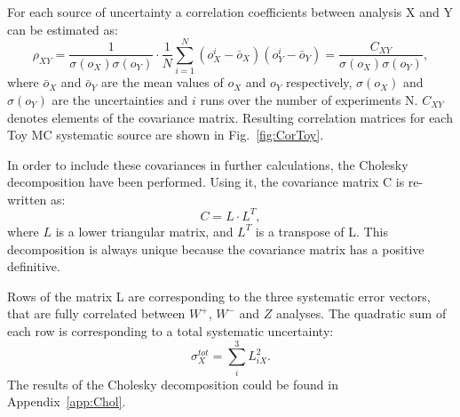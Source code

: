 For each source of uncertainty a correlation coefficients between analysis X and Y can be estimated as:
\begin{equation}\label{eq:Corr}
\rho_{XY}=\frac{1}{\sigma(o_X)\sigma(o_Y)}\cdot \frac{1}{N} \sum_{i=1}^N (o^i_X-\bar{o}_X) (o^i_Y-\bar{o}_Y)=\frac{C_{XY}}{\sigma(o_X)\sigma(o_Y)},
\end{equation}
where $\bar{o}_X$ and $\bar{o}_Y$ are the mean values of $o_X$ and $o_Y$ respectively,  $\sigma(o_X)$ and $\sigma(o_Y)$ are the uncertainties and $i$ runs over the number of experiments N. $C_{XY}$ denotes elements of the covariance matrix. Resulting correlation matrices for each Toy MC systematic source are shown in Fig.~\ref{fig:CorToy}.



In order to include these covariances in further calculations, the Cholesky decomposition \cite{Dickinson1978} have been performed. Using it, the covariance matrix C is re-written as:
\begin{equation}
C=L \cdot L^{T},
\end{equation}
where $L$ is a lower triangular matrix, and $L^{T}$ is a transpose of L. This decomposition is always unique because the covariance matrix has a positive definitive.
 
Rows of the matrix L are corresponding to the three systematic error vectors, that are fully correlated between $W^{+}$, $W^{-}$ and $Z$ analyses. The quadratic sum of each row is corresponding to a total systematic uncertainty:
\begin{equation}
\sigma_{X}^{tot} = \sum_{i}^3 L_{iX}^2.
\end{equation}
The results of the Cholesky decomposition could be found in Appendix~\ref{app:Chol}.